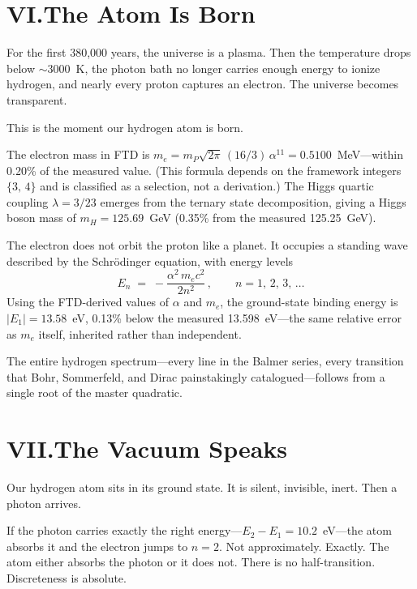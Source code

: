 \documentclass[11pt,a4paper]{article}
\begin{document}
\section*{VI.\quad The Atom Is Born}

For the first 380,000 years, the universe is a plasma. Then the temperature drops below $\sim 3000$~K, the photon bath no longer carries enough energy to ionize hydrogen, and nearly every proton captures an electron. The universe becomes transparent.

This is the moment our hydrogen atom is born.

The electron mass in FTD is $m_e = m_P\sqrt{2\pi}\,(16/3)\,\alpha^{11} = 0.5100$~MeV---within 0.20\% of the measured value. (This formula depends on the framework integers $\{3,\,4\}$ and is classified as a selection, not a derivation.) The Higgs quartic coupling $\lambda = 3/23$ emerges from the ternary state decomposition, giving a Higgs boson mass of $m_H = 125.69$~GeV (0.35\% from the measured 125.25~GeV).

The electron does not orbit the proton like a planet. It occupies a standing wave described by the Schr\"odinger equation, with energy levels
\[
E_n \;=\; -\frac{\alpha^2\,m_e c^2}{2n^2}\,, \qquad n = 1,\,2,\,3,\,\ldots
\]
Using the FTD-derived values of $\alpha$ and $m_e$, the ground-state binding energy is $|E_1| = 13.58$~eV, 0.13\% below the measured 13.598~eV---the same relative error as $m_e$ itself, inherited rather than independent.

The entire hydrogen spectrum---every line in the Balmer series, every transition that Bohr, Sommerfeld, and Dirac painstakingly catalogued---follows from a single root of the master quadratic.

\section*{VII.\quad The Vacuum Speaks}

Our hydrogen atom sits in its ground state. It is silent, invisible, inert. Then a photon arrives.

If the photon carries exactly the right energy---$E_2 - E_1 = 10.2$~eV---the atom absorbs it and the electron jumps to $n = 2$. Not approximately. Exactly. The atom either absorbs the photon or it does not. There is no half-transition. Discreteness is absolute.
\end{document}
